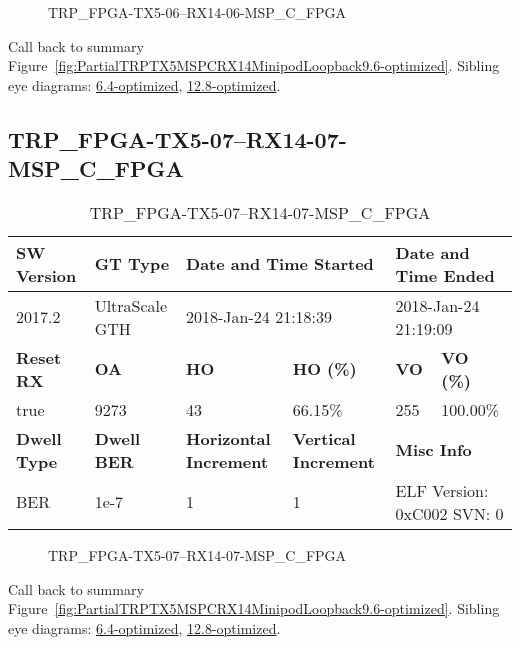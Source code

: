 \begin{figure}[h]
\caption{TRP\_FPGA-TX5-06--RX14-06-MSP\_C\_FPGA} \label{fig:TRPFPGATX506RX1406MSPCFPGA9.6-optimized}
\end{figure}

Call back to summary Figure~\ref{fig:PartialTRPTX5MSPCRX14MinipodLoopback9.6-optimized}.
Sibling eye diagrams: \hyperref[sec:TRPFPGATX506RX1406MSPCFPGA6.4-optimized]{6.4-optimized}, \hyperref[sec:TRPFPGATX506RX1406MSPCFPGA12.8-optimized]{12.8-optimized}.

\clearpage
\newpage


\subsection{TRP\_FPGA-TX5-07--RX14-07-MSP\_C\_FPGA}\label{sec:TRPFPGATX507RX1407MSPCFPGA9.6-optimized}

\begin{table}[h]
\centering
\caption{TRP\_FPGA-TX5-07--RX14-07-MSP\_C\_FPGA}
\label{tab:TRPFPGATX507RX1407MSPCFPGA9.6-optimized}
\begin{tabular}{@{}|l|l|l|l|l|l|@{}}
\toprule
\textbf{SW Version}                & \textbf{GT Type}   & \multicolumn{2}{l|}{\textbf{Date and Time Started}}            & \multicolumn{2}{l|}{\textbf{Date and Time Ended}}        \\ \midrule
2017.2                       & UltraScale GTH          & \multicolumn{2}{l|}{2018-Jan-24 21:18:39}                   & \multicolumn{2}{l|}{2018-Jan-24 21:19:09}               \\ \midrule
\textbf{Reset RX}                  & \textbf{OA} & \textbf{HO}   & \textbf{HO (\%)} & \textbf{VO} & \textbf{VO (\%)} \\ \midrule
true & 9273        & 43          & 66.15\%        & 255        & 100.00\%       \\ \midrule
\textbf{Dwell Type}                & \textbf{Dwell BER} & \textbf{Horizontal Increment} & \textbf{Vertical Increment}    & \multicolumn{2}{l|}{\textbf{Misc Info}}                  \\ \midrule
BER                            & 1e-7        & 1        & 1           & \multicolumn{2}{l|}{ELF Version: 0xC002 SVN: 0}                         \\ \bottomrule
\end{tabular}
\end{table}

\begin{figure}[h]
\caption{TRP\_FPGA-TX5-07--RX14-07-MSP\_C\_FPGA} \label{fig:TRPFPGATX507RX1407MSPCFPGA9.6-optimized}
\end{figure}

Call back to summary Figure~\ref{fig:PartialTRPTX5MSPCRX14MinipodLoopback9.6-optimized}.
Sibling eye diagrams: \hyperref[sec:TRPFPGATX507RX1407MSPCFPGA6.4-optimized]{6.4-optimized}, \hyperref[sec:TRPFPGATX507RX1407MSPCFPGA12.8-optimized]{12.8-optimized}.

\clearpage
\newpage

